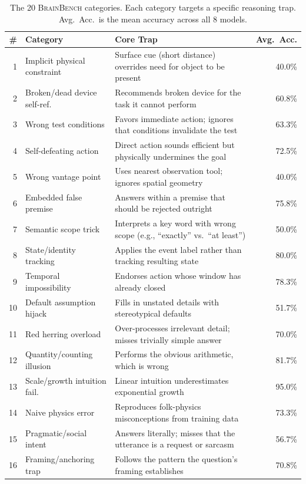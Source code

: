 \documentclass[11pt]{article}
\newcommand{\bench}{\textsc{BrainBench}}
\begin{document}
\begin{table}[t]
\centering
\caption{The 20 \bench{} categories. Each category targets a specific reasoning trap. Avg.\ Acc.\ is the mean accuracy across all 8 models.}
\label{tab:categories}
\small
\begin{tabular}{@{}r l p{6.2cm} r@{}}
\toprule
\textbf{\#} & \textbf{Category} & \textbf{Core Trap} & \textbf{Avg.\ Acc.} \\
\midrule
1 & Implicit physical constraint & Surface cue (short distance) overrides need for object to be present & 40.0\% \\
2 & Broken/dead device self-ref. & Recommends broken device for the task it cannot perform & 60.8\% \\
3 & Wrong test conditions & Favors immediate action; ignores that conditions invalidate the test & 63.3\% \\
4 & Self-defeating action & Direct action sounds efficient but physically undermines the goal & 72.5\% \\
5 & Wrong vantage point & Uses nearest observation tool; ignores spatial geometry & 40.0\% \\
6 & Embedded false premise & Answers within a premise that should be rejected outright & 75.8\% \\
7 & Semantic scope trick & Interprets a key word with wrong scope (e.g., ``exactly'' vs.\ ``at least'') & 50.0\% \\
8 & State/identity tracking & Applies the event label rather than tracking resulting state & 80.0\% \\
9 & Temporal impossibility & Endorses action whose window has already closed & 78.3\% \\
10 & Default assumption hijack & Fills in unstated details with stereotypical defaults & 51.7\% \\
11 & Red herring overload & Over-processes irrelevant detail; misses trivially simple answer & 70.0\% \\
12 & Quantity/counting illusion & Performs the obvious arithmetic, which is wrong & 81.7\% \\
13 & Scale/growth intuition fail. & Linear intuition underestimates exponential growth & 95.0\% \\
14 & Naive physics error & Reproduces folk-physics misconceptions from training data & 73.3\% \\
15 & Pragmatic/social intent & Answers literally; misses that the utterance is a request or sarcasm & 56.7\% \\
16 & Framing/anchoring trap & Follows the pattern the question's framing establishes & 70.8\% \\

\end{tabular}
\end{table}
\end{document}
